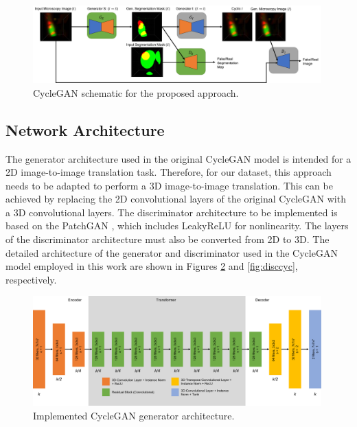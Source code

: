 \begin{figure}[!htb]
  \centering
  \includegraphics[width=0.99\textwidth]{Images/diagrama.jpg}
  \caption[CycleGAN schematic for the proposed approach.]{CycleGAN schematic for the proposed approach.}
  \label{fig:diagrama}
\end{figure}


\subsection*{Network Architecture}

The generator architecture used in the original CycleGAN model is intended for a 2D image-to-image translation task. Therefore, for our dataset, this approach needs to be adapted to perform a 3D image-to-image translation. This can be achieved by replacing the 2D convolutional layers of the original CycleGAN with a 3D convolutional layers.  The discriminator architecture to be implemented is based on the PatchGAN \cite{isola2018imagetoimage}, which includes LeakyReLU for nonlinearity. The layers of the discriminator architecture must also be converted from 2D to 3D. The detailed architecture of the generator and discriminator used in the CycleGAN model employed in this work are shown in Figures \ref{fig:gencyc} and \ref{fig:disccyc}, respectively.

\begin{figure}[!htb]
  \centering
  \includegraphics[width=0.99\textwidth]{Images/generator_cyclegan.jpg}
  \caption[Implemented CycleGAN generator architecture.]{Implemented CycleGAN generator architecture.}
  \label{fig:gencyc}
\end{figure}


